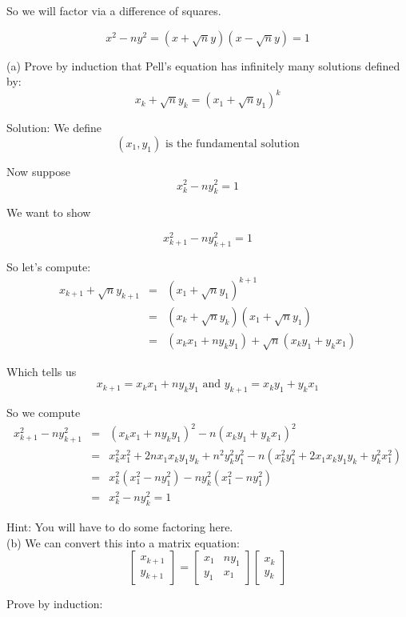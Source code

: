 \documentclass[16 pt]{amsart}
\theoremstyle{definition}
\theoremstyle{remark}
\numberwithin{equation}{subsection}
\begin{document}
So we will factor via a difference of squares.

\[
x^2 - n y^2 = (x + \sqrt{n}y)(x-\sqrt{n}y) = 1
\]

(a) Prove by induction that Pell's equation has infinitely many solutions defined by:
\[
x_k + \sqrt{n} y_k = (x_1+\sqrt{n}y_1)^k
\]


Solution: We define
\[
(x_1,y_1) \text{ is the fundamental solution}
\]

Now suppose 
\[
x_k^2- ny_k^2 = 1
\]

We want to show

\[
x_{k+1}^2- ny_{k+1}^2 = 1
\]


So let's compute:
\begin{eqnarray}
x_{k+1} + \sqrt{n} y_{k+1} & = & (x_1+\sqrt{n} y_1)^{k+1} \nonumber \\
& = & (x_k+\sqrt{n}y_k)(x_1 + \sqrt{n}y_1) \nonumber \\
& = & (x_k x_1 + ny_ky_1) + \sqrt{n}(x_ky_1 + y_kx_1)\nonumber
\end{eqnarray}

Which tells us
\[
x_{k+1} = x_kx_1 + ny_ky_1 \text{ and } y_{k+1} = x_ky_1 + y_kx_1
\]

So we compute
\begin{eqnarray}
x_{k+1}^2 - ny_{k+1}^2 & = & (x_kx_1 + ny_ky_1)^2 - n(x_ky_1 + y_kx_1)^2 \nonumber \\
& = & x_k^2x_1^2 + 2nx_1x_ky_1y_k + n^2y_k^2y_1^2 - n(x_k^2y_1^2 + 2x_1x_ky_1y_k + y_k^2x_1^2) \nonumber\\
& = & x_k^2(x_1^2-ny_1^2) - n y_k^2(x_1^2-ny_1^2) \nonumber \\
& = & x_k^2-ny_k^2 = 1 \nonumber
\end{eqnarray}


Hint: You will have to do some factoring here.\\

(b) We can convert this into a matrix equation:
\[
\begin{bmatrix}
x_{k+1}\\ y_{k+1}
\end{bmatrix} = 
\begin{bmatrix}
x_1 & ny_1\\
y_1 & x_1
\end{bmatrix}
\begin{bmatrix}
x_k \\ y_k
\end{bmatrix}
\]

Prove by induction:
\end{document}
